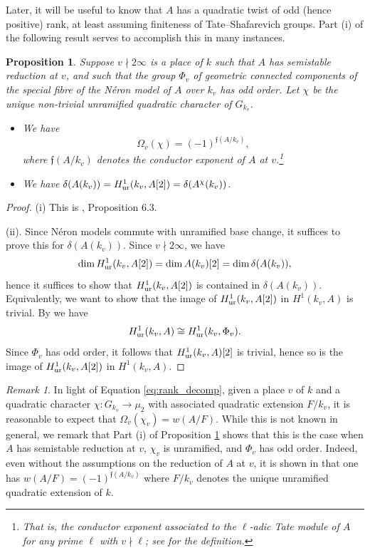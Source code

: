 \documentclass[10pt]{amsart}
\numberwithin{equation}{section}
\newtheorem{proposition}[equation]{Proposition}
\theoremstyle{remark}
\newtheorem{remark}[equation]{Remark}
\theoremstyle{definition}
\theoremstyle{definition}
\theoremstyle{definition}
\theoremstyle{definition}
\theoremstyle{definition}
\theoremstyle{definition}
\theoremstyle{definition}
\theoremstyle{definition}
\begin{document}
 
 Later, it will be useful to know that $A$ has a quadratic twist of odd (hence positive) rank, at least assuming finiteness of Tate--Shafarevich groups. Part (i) of the following result serves to accomplish this in many instances. 

\begin{proposition}  \label{prop:Neron_model}
 Suppose $v\nmid 2\infty$ is a place of $k$ such that $A$ has semistable reduction at $v$, and such that the group $\Phi_v$ of geometric connected components of the special fibre of the N\'{e}ron model of $A$ over $k_v$ has odd order. Let $\chi$ be the unique non-trivial unramified quadratic character of $G_{k_v}$.
 \begin{itemize}
 \item[(i)] We have \[\Omega_v(\chi)=(-1)^{\mathfrak{f}(A/k_v)},\]
 where $\mathfrak{f}(A/k_v)$ denotes the conductor exponent of $A$ at $v$.\footnote{That is, the conductor exponent associated to the $\ell$-adic Tate module of $A$ for any prime $\ell$  with $v\nmid \ell$; see \cite[Section 2]{Serre_1970} for the definition.}
 \item[(ii)] We have $\delta(A(k_v))=H^1_{\textup{ur}}(k_v,A[2])=\delta(A^\chi(k_v))$.
 \end{itemize}   
\end{proposition}

\begin{proof}
 (i) This is \cite{mor2025}, Proposition 6.3. 

(ii).  Since N\'{e}ron models commute with unramified base change, it suffices to prove this for $\delta(A(k_v))$. Since $v\nmid 2\infty$, we have
\[\dim H^1_{\textup{ur}}(k_v,A[2])=\dim A(k_v)[2]=\dim \delta(A(k_v)),\]
hence it suffices to show that $H^1_{\textup{ur}}(k_v,A[2])$ is contained in $\delta(A(k_v))$. Equivalently, we want to show that the image of $H^1_{\textup{ur}}(k_v,A[2])$ in $H^1(k_v,A)$ is trivial. 
By  \cite[Proposition I.3.8]{MR2261462} we have \[H^1_{\textup{ur}}(k_{v},A)\cong H^1_{\textup{ur}}(k_{v},\Phi_v).\]
Since $\Phi_v$ has odd order, it follows that  $H^1_{\textup{ur}}(k_{v},A)[2]$ is trivial, hence so is the image of $H^1_{\textup{ur}}(k_v,A[2])$ in $H^1(k_v,A)$.
\end{proof}
 
 \begin{remark}
 In light of Equation \eqref{eq:rank_decomp}, given a place $v$ of $k$ and a quadratic character $\chi:G_{k_v}\to \mu_2$ with associated quadratic extension $F/k_v$, it is reasonable to expect that $\Omega_v(\chi_v)=w(A/F)$. While this is not known in general, we remark that Part (i) of Proposition \ref{prop:Neron_model} shows that this is the case when $A$ has semistable reduction at $v$, $\chi_v$ is unramified, and $\Phi_v$ has odd order. Indeed, even without the assumptions on the reduction of $A$ at $v$, it is shown in \cite[Corollary 4.6]{MR3860395} that one has $w(A/F)=(-1)^{\mathfrak{f}(A/k_v)}$  where $F/k_v$ denotes the unique unramified quadratic extension of $k$.  
 \end{remark}
 
\end{document}
